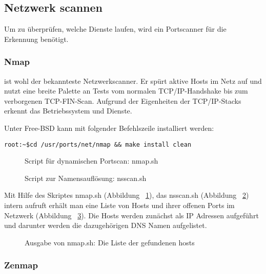 \subsection{Netzwerk scannen}

Um zu überprüfen, welche Dienste laufen, wird ein Portscanner für die Erkennung
benötigt.

\subsubsection{Nmap}

\Nmap{} ist wohl der bekannteste Netzwerkscanner. Er spürt aktive Hosts im Netz auf
und nutzt eine breite Palette an Tests vom normalen TCP/IP-Handshake bis zum
verborgenen TCP-FIN-Scan. Aufgrund der Eigenheiten der TCP/IP-Stacks erkennt
\Nmap{} das Betriebssystem und Dienste.

Unter Free-BSD kann \Nmap{} mit folgender Befehlszeile installiert werden:

\begin{verbatim}
root:~$cd /usr/ports/net/nmap && make install clean
\end{verbatim}

\begin{figure}

\caption{Script für dynamischen Portscan: nmap.sh}
\label{fig:nmap}
\end{figure}

\begin{figure}

\caption{Script zur Namensauflösung: nsscan.sh}
\label{fig:nsscan}
\end{figure}

Mit Hilfe des Skriptes nmap.sh (Abbildung ~\ref{fig:nmap}), das nsscan.sh
(Abbildung ~\ref{fig:nsscan}) intern aufruft erhält man eine Liste von Hosts und
ihrer offenen Ports im Netzwerk (Abbildung ~\ref{fig:hostlist}). Die Hosts
werden zunächst als IP Adressen aufgeführt und darunter werden die dazugehörigen
DNS Namen aufgelistet.

\begin{figure}

\caption{Ausgabe von nmap.sh: Die Liste der gefundenen hosts}
\label{fig:hostlist}
\end{figure}

\subsubsection{Zenmap}

